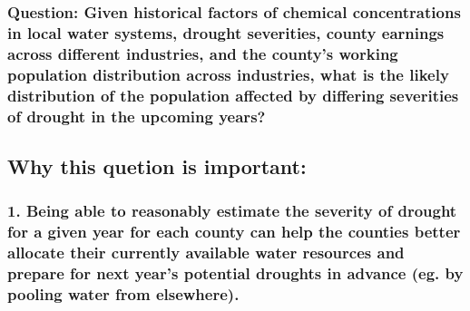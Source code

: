 \documentclass[11pt]{article}
\begin{document}
    \hypertarget{question-given-historical-factors-of-chemical-concentrations-in-local-water-systems-drought-severities-county-earnings-across-different-industries-and-the-countys-working-population-distribution-across-industries-what-is-the-likely-distribution-of-the-population-affected-by-differing-severities-of-drought-in-the-upcoming-years}{%
\subsubsection{Question: Given historical factors of chemical
concentrations in local water systems, drought severities, county
earnings across different industries, and the county's working
population distribution across industries, what is the likely
distribution of the population affected by differing severities of
drought in the upcoming
years?}\label{question-given-historical-factors-of-chemical-concentrations-in-local-water-systems-drought-severities-county-earnings-across-different-industries-and-the-countys-working-population-distribution-across-industries-what-is-the-likely-distribution-of-the-population-affected-by-differing-severities-of-drought-in-the-upcoming-years}}

    \hypertarget{why-this-quetion-is-important}{%
\subsection{Why this quetion is
important:}\label{why-this-quetion-is-important}}

\hypertarget{being-able-to-reasonably-estimate-the-severity-of-drought-for-a-given-year-for-each-county-can-help-the-counties-better-allocate-their-currently-available-water-resources-and-prepare-for-next-years-potential-droughts-in-advance-eg.-by-pooling-water-from-elsewhere.}{%
\subsubsection{1. Being able to reasonably estimate the severity of
drought for a given year for each county can help the counties better
allocate their currently available water resources and prepare for next
year's potential droughts in advance (eg. by pooling water from
elsewhere).}\label{being-able-to-reasonably-estimate-the-severity-of-drought-for-a-given-year-for-each-county-can-help-the-counties-better-allocate-their-currently-available-water-resources-and-prepare-for-next-years-potential-droughts-in-advance-eg.-by-pooling-water-from-elsewhere.}}
\end{document}
